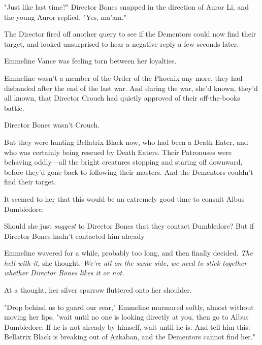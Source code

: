 "Just like last time?" Director Bones snapped in the direction of Auror Li, and
the young Auror replied, "Yes, ma'am."

The Director fired off another query to see if the Dementors could now find
their target, and looked unsurprised to hear a negative reply a few seconds
later.

Emmeline Vance was feeling torn between her loyalties.

Emmeline wasn't a member of the Order of the Phoenix any more, they had
disbanded after the end of the last war. And during the war, she'd known,
they'd all known, that Director Crouch had quietly approved of their
off-the-books battle.

Director Bones wasn't Crouch.

But they were hunting Bellatrix Black now, who had been a Death Eater, and who
was certainly being rescued by Death Eaters. Their Patronuses were behaving
oddly---all the bright creatures stopping and staring off downward, before
they'd gone back to following their masters. And the Dementors couldn't find
their target.

It seemed to her that this would be an extremely good time to consult Albus
Dumbledore.

Should she just \emph{suggest} to Director Bones that they contact Dumbledore?
But if Director Bones hadn't contacted him already{\el}

Emmeline wavered for a while, probably too long, and then finally decided.
\emph{The hell with it,} she thought. \emph{We're all on the same side, we need
to stick together whether Director Bones likes it or not.}

At a thought, her silver sparrow fluttered onto her shoulder.

"Drop behind us to guard our rear," Emmeline murmured softly, almost without
moving her lips, "wait until no one is looking directly at you, then go to
Albus Dumbledore. If he is not already by himself, wait until he is. And tell
him this: Bellatrix Black is breaking out of Azkaban, and the Dementors cannot
find her."
